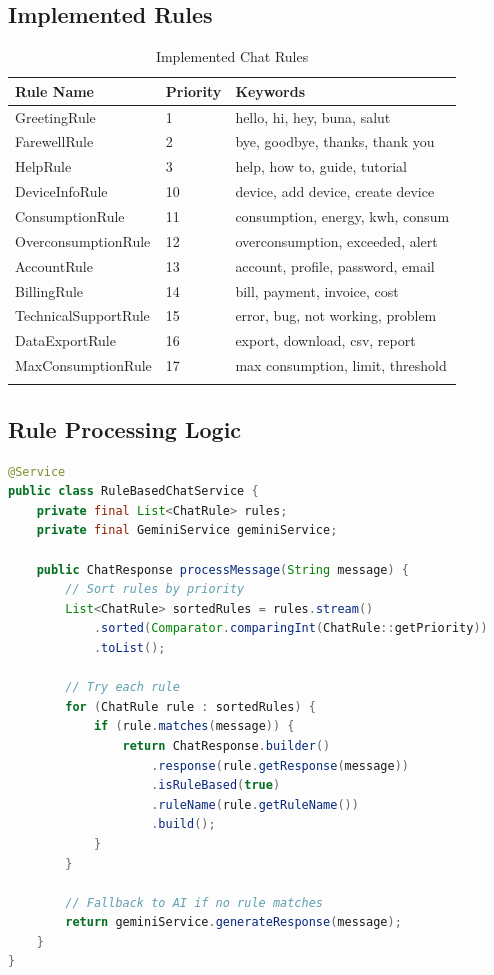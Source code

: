 \documentclass[12pt,a4paper]{article}
\begin{document}
\subsection{Implemented Rules}
\begin{longtable}{|l|l|p{6cm}|}
\hline
\textbf{Rule Name} & \textbf{Priority} & \textbf{Keywords} \\
\hline
\endhead
GreetingRule & 1 & hello, hi, hey, buna, salut \\
\hline
FarewellRule & 2 & bye, goodbye, thanks, thank you \\
\hline
HelpRule & 3 & help, how to, guide, tutorial \\
\hline
DeviceInfoRule & 10 & device, add device, create device \\
\hline
ConsumptionRule & 11 & consumption, energy, kwh, consum \\
\hline
OverconsumptionRule & 12 & overconsumption, exceeded, alert \\
\hline
AccountRule & 13 & account, profile, password, email \\
\hline
BillingRule & 14 & bill, payment, invoice, cost \\
\hline
TechnicalSupportRule & 15 & error, bug, not working, problem \\
\hline
DataExportRule & 16 & export, download, csv, report \\
\hline
MaxConsumptionRule & 17 & max consumption, limit, threshold \\
\hline
\caption{Implemented Chat Rules}
\end{longtable}

\subsection{Rule Processing Logic}
\begin{lstlisting}[language=Java, caption=RuleBasedChatService.java]
@Service
public class RuleBasedChatService {
    private final List<ChatRule> rules;
    private final GeminiService geminiService;
    
    public ChatResponse processMessage(String message) {
        // Sort rules by priority
        List<ChatRule> sortedRules = rules.stream()
            .sorted(Comparator.comparingInt(ChatRule::getPriority))
            .toList();
        
        // Try each rule
        for (ChatRule rule : sortedRules) {
            if (rule.matches(message)) {
                return ChatResponse.builder()
                    .response(rule.getResponse(message))
                    .isRuleBased(true)
                    .ruleName(rule.getRuleName())
                    .build();
            }
        }
        
        // Fallback to AI if no rule matches
        return geminiService.generateResponse(message);
    }
}
\end{lstlisting}
\end{document}
